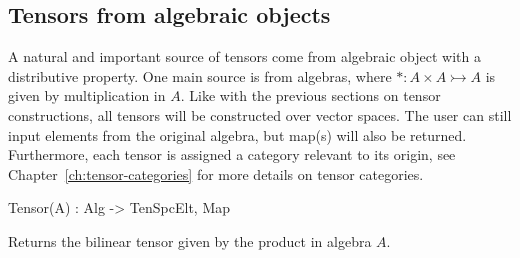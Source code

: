 \subsection{Tensors from algebraic objects}
A natural and important source of tensors come from algebraic object with a distributive property.
One main source is from algebras, where $*:A\times A\rightarrowtail A$ is given by multiplication in $A$. 
Like with the previous sections on tensor constructions, all tensors will be constructed over vector spaces. 
The user can still input elements from the original algebra, but map(s) will also be returned.
Furthermore, each tensor is assigned a category relevant to its origin, see Chapter~\ref{ch:tensor-categories} for more details on tensor categories. 


\begin{intrinsics}
Tensor(A) : Alg -> TenSpcElt, Map
\end{intrinsics}

Returns the bilinear tensor given by the product in algebra $A$.

